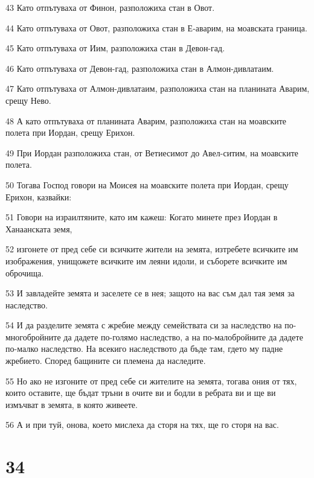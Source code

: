 \par 43 Като отпътуваха от Финон, разположиха стан в Овот.
\par 44 Като отпътуваха от Овот, разположиха стан в Е-аварим, на моавската граница.
\par 45 Като отпътуваха от Иим, разположиха стан в Девон-гад.
\par 46 Като отпътуваха от Девон-гад, разположиха стан в Алмон-дивлатаим.
\par 47 Като отпътуваха от Алмон-дивлатаим, разположиха стан на планината Аварим, срещу Нево.
\par 48 А като отпътуваха от планината Аварим, разположиха стан на моавските полета при Иордан, срещу Ерихон.
\par 49 При Иордан разположиха стан, от Ветиесимот до Авел-ситим, на моавските полета.
\par 50 Тогава Господ говори на Моисея на моавските полета при Иордан, срещу Ерихон, казвайки:
\par 51 Говори на израилтяните, като им кажеш: Когато минете през Иордан в Ханаанската земя,
\par 52 изгонете от пред себе си всичките жители на земята, изтребете всичките им изображения, унищожете всичките им леяни идоли, и съборете всичките им оброчища.
\par 53 И завладейте земята и заселете се в нея; защото на вас съм дал тая земя за наследство.
\par 54 И да разделите земята с жребие между семействата си за наследство на по-многобройните да дадете по-голямо наследство, а на по-малобройните да дадете по-малко наследство. На всекиго наследството да бъде там, гдето му падне жребието. Според бащините си племена да наследите.
\par 55 Но ако не изгоните от пред себе си жителите на земята, тогава ония от тях, които оставите, ще бъдат тръни в очите ви и бодли в ребрата ви и ще ви измъчват в земята, в която живеете.
\par 56 А и при туй, онова, което мислеха да сторя на тях, ще го сторя на вас.

\chapter{34}

